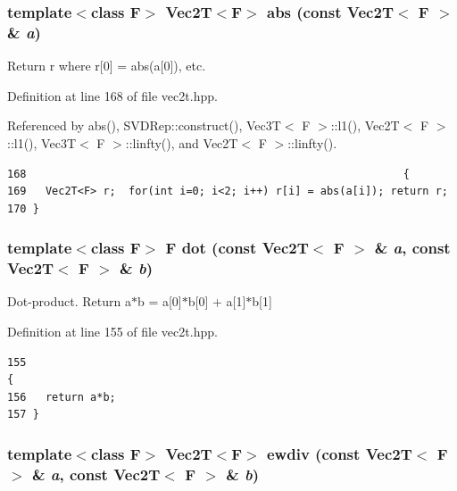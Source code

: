 \subsubsection{\setlength{\rightskip}{0pt plus 5cm}template$<$class F$>$ {\bf Vec2T}$<$F$>$ abs (const {\bf Vec2T}$<$ F $>$ \& {\em a})\hspace{0.3cm}{\tt  [inline]}}\label{vec2t_8hpp_a570ec41ec074d767bfb786f564ad724_a570ec41ec074d767bfb786f564ad724}


Return r where r[0] = abs(a[0]), etc. 

Definition at line 168 of file vec2t.hpp.

Referenced by abs(), SVDRep::construct(), Vec3T$<$ F $>$::l1(), Vec2T$<$ F $>$::l1(), Vec3T$<$ F $>$::linfty(), and Vec2T$<$ F $>$::linfty().

\footnotesize\begin{verbatim}168                                                           {
169   Vec2T<F> r;  for(int i=0; i<2; i++) r[i] = abs(a[i]); return r;
170 }
\end{verbatim}\normalsize 


\subsubsection{\setlength{\rightskip}{0pt plus 5cm}template$<$class F$>$ F dot (const {\bf Vec2T}$<$ F $>$ \& {\em a}, const {\bf Vec2T}$<$ F $>$ \& {\em b})\hspace{0.3cm}{\tt  [inline]}}\label{vec2t_8hpp_b78a1bba220fd50c2651cc22a0c80e7d_b78a1bba220fd50c2651cc22a0c80e7d}


Dot-product. Return a$\ast$b = a[0]$\ast$b[0] + a[1]$\ast$b[1] 

Definition at line 155 of file vec2t.hpp.

\footnotesize\begin{verbatim}155                                                                              {
156   return a*b;
157 }
\end{verbatim}\normalsize 


\subsubsection{\setlength{\rightskip}{0pt plus 5cm}template$<$class F$>$ {\bf Vec2T}$<$F$>$ ewdiv (const {\bf Vec2T}$<$ F $>$ \& {\em a}, const {\bf Vec2T}$<$ F $>$ \& {\em b})\hspace{0.3cm}{\tt  [inline]}}\label{vec2t_8hpp_fdf92a661cc9e0cba72c9027b4486631_fdf92a661cc9e0cba72c9027b4486631}


